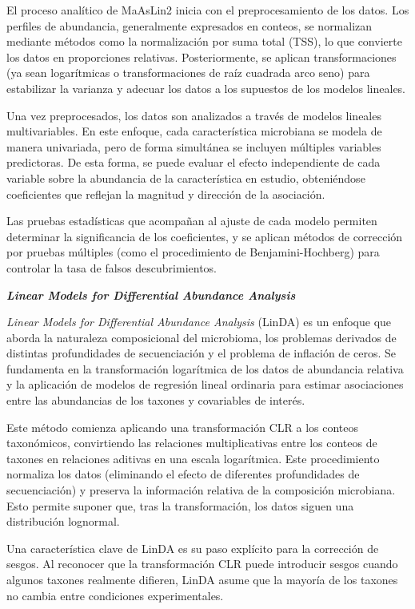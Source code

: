 El proceso analítico de MaAsLin2 inicia con el preprocesamiento de los datos. Los perfiles de abundancia, generalmente expresados en conteos, se normalizan mediante métodos como la normalización por suma total (TSS), lo que convierte los datos en proporciones relativas. Posteriormente, se aplican transformaciones (ya sean logarítmicas o transformaciones de raíz cuadrada arco seno) para estabilizar la varianza y adecuar los datos a los supuestos de los modelos lineales.

Una vez preprocesados, los datos son analizados a través de modelos lineales multivariables. En este enfoque, cada característica microbiana se modela de manera univariada, pero de forma simultánea se incluyen múltiples variables predictoras. De esta forma, se puede evaluar el efecto independiente de cada variable sobre la abundancia de la característica en estudio, obteniéndose coeficientes que reflejan la magnitud y dirección de la asociación.

Las pruebas estadísticas que acompañan al ajuste de cada modelo permiten determinar la significancia de los coeficientes, y se aplican métodos de corrección por pruebas múltiples (como el procedimiento de Benjamini-Hochberg) para controlar la tasa de falsos descubrimientos.


\textbf{\textit{Linear Models for Differential Abundance Analysis}}

\textit{Linear Models for Differential Abundance Analysis} (LinDA) \cite{zhou2022linda} es un enfoque que aborda la naturaleza composicional del microbioma, los problemas derivados de distintas profundidades de secuenciación y el problema de inflación de ceros. Se fundamenta en la transformación logarítmica de los datos de abundancia relativa y la aplicación de modelos de regresión lineal ordinaria para estimar asociaciones entre las abundancias de los taxones y covariables de interés.

Este método comienza aplicando una transformación CLR a los conteos taxonómicos, convirtiendo las relaciones multiplicativas entre los conteos de taxones en relaciones aditivas en una escala logarítmica. Este procedimiento normaliza los datos (eliminando el efecto de diferentes profundidades de secuenciación) y preserva la información relativa de la composición microbiana. Esto permite suponer que, tras la transformación, los datos siguen una distribución lognormal.

Una característica clave de LinDA es su paso explícito para la corrección de sesgos. Al reconocer que la transformación CLR puede introducir sesgos cuando algunos taxones realmente difieren, LinDA asume que la mayoría de los taxones no cambia entre condiciones experimentales.

